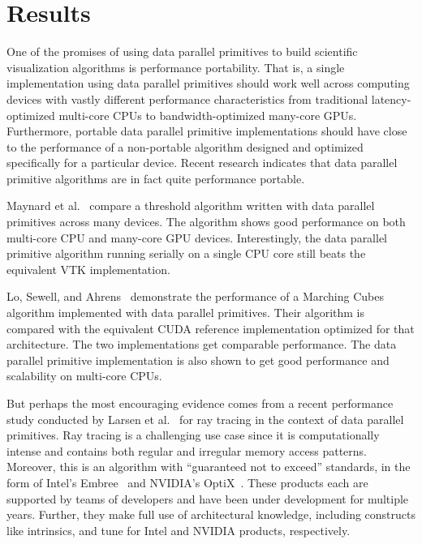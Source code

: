 \documentclass{superfri}
\newcommand*{\scite}[1]{~\cite{#1}}
\newcommand{\etal}{et al.\xspace}
\begin{document}
\section{Results}

\noindent
One of the promises of using data parallel primitives to build scientific
visualization algorithms is performance portability. That is, a single
implementation using data parallel primitives should work well across
computing devices with vastly different performance characteristics from
traditional latency-optimized multi-core CPUs to bandwidth-optimized
many-core GPUs. Furthermore, portable data parallel primitive
implementations should have close to the performance of a non-portable
algorithm designed and optimized specifically for a particular device.
Recent research indicates that data parallel primitive algorithms are in
fact quite performance portable.

Maynard \etal\scite{Maynard2013} compare a threshold algorithm written with
data parallel primitives across many devices. The algorithm shows good
performance on both multi-core CPU and many-core GPU devices.
Interestingly, the data parallel primitive algorithm running serially on a
single CPU core still beats the equivalent VTK implementation.

Lo, Sewell, and Ahrens\scite{PISTON} demonstrate the performance of a
Marching Cubes algorithm implemented with data parallel primitives. Their
algorithm is compared with the equivalent CUDA reference implementation
optimized for that architecture. The two implementations get comparable
performance. The data parallel primitive implementation is also shown to
get good performance and scalability on multi-core CPUs.

But perhaps the most encouraging evidence comes from a recent performance
study conducted by Larsen \etal\scite{Larsen:PacVis2015} for ray tracing in
the context of data parallel primitives.
%
Ray tracing is a challenging use case since it is computationally
intense and contains both regular and irregular memory access patterns.
%
Moreover, this is an algorithm with ``guaranteed not to exceed''
standards, in the form of Intel's Embree\scite{wald2014embree} and
NVIDIA's OptiX\scite{parker2010optix}.
%
These products each are supported by teams of developers and have been under
development for multiple years. 
%
Further, they make full use of architectural knowledge, including
constructs like intrinsics, and tune for
Intel and NVIDIA products, respectively.
\end{document}
